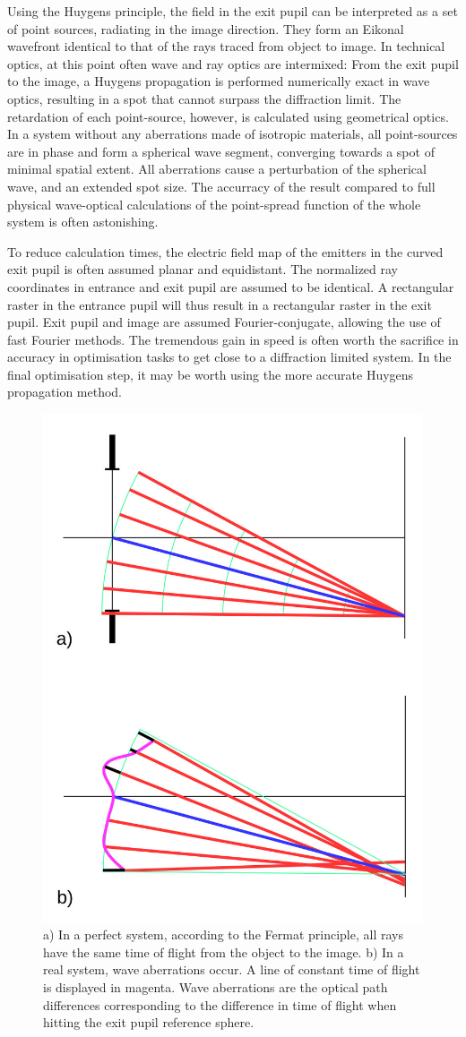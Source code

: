 \documentclass[12pt,a4paper,twoside,openright,BCOR10mm,headsepline,titlepage,abstracton,chapterprefix,final]{scrreprt}
\begin{document}
Using the Huygens principle, the field in the exit pupil can be interpreted as a set of point sources, radiating in the image direction. 
They form an Eikonal wavefront identical to that of the rays traced from object to image.
In technical optics, at this point often wave and ray optics are intermixed:
From the exit pupil to the image, a Huygens propagation is performed numerically exact in wave optics, resulting in a spot that cannot surpass the diffraction limit. 
The retardation of each point-source, however, is calculated using geometrical optics.
In a system without any aberrations made of isotropic materials, all point-sources are in phase and form a spherical wave segment, converging towards a spot of minimal spatial extent.
All aberrations cause a perturbation of the spherical wave, and an extended spot size.
The accurracy of the result compared to full physical wave-optical calculations of the point-spread function of the whole system is often astonishing. 

To reduce calculation times, the electric field map of the emitters in the curved exit pupil is often assumed planar and equidistant. 
The normalized ray coordinates in entrance and exit pupil are assumed to be identical.
A rectangular raster in the entrance pupil will thus result in a rectangular raster in the exit pupil.
Exit pupil and image are assumed Fourier-conjugate, allowing the use of fast Fourier methods.
The tremendous gain in speed is often worth the sacrifice in accuracy in optimisation tasks to get close to a diffraction limited system.
In the final optimisation step, it may be worth using the more accurate Huygens propagation method.

\begin{figure}
  \centering
   \includegraphics[width=0.5\columnwidth]{waveaberrations}
  \caption{a) In a perfect system, according to the Fermat principle, all rays have the same time of flight from the object to the image. b) In a real system, wave aberrations occur. A line of constant time of flight is displayed in magenta.
  Wave aberrations are the optical path differences corresponding to the difference in time of flight when hitting the exit pupil reference sphere.}
  \label{fig:waveaberrations}
\end{figure}
\end{document}
